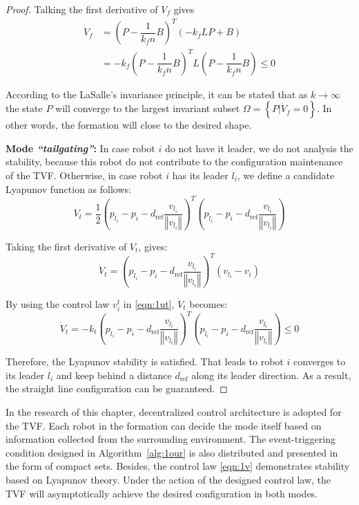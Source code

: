 \begin{proof}
Talking the first derivative of $V_f$ gives
\begin{equation}
\begin{aligned}
    \dot{V}_f&=\left(P-\dfrac{1}{k_fn}B\right)^T\left(-k_fLP+B\right)\\
    &=-k_f\left(P-\dfrac{1}{k_fn}B\right)^TL\left(P-\dfrac{1}{k_fn}B\right)\leq0
\end{aligned}
\end{equation}

According to the LaSalle’s invariance
principle, it can be stated that as $k\to\infty$ the state $P$ will converge to the largest invariant subset $\Omega=\left\{P|\dot{V}_f=0\right\}$. In other words, the formation will close to the desired shape.

\textbf{Mode \textit{``tailgating''}:} In case robot $i$ do not have it leader, we do not analysis the stability, because this robot do not contribute to the configuration maintenance of the TVF. Otherwise, in case robot $i$ has its leader $l_i$, we define a candidate Lyapunov function as follows:
\begin{equation}
    V_{t}=\dfrac{1}{2}\left(p_{l_i}-p_{i}-d_\text{ref}\dfrac{v_{l_i}}{\left\Vert v_{l_i}\right\Vert}\right)^{T}\left(p_{l_i}-p_{i}-d_\text{ref}\dfrac{v_{l_i}}{\left\Vert v_{l_i}\right\Vert}\right)
\end{equation}

Taking the first derivative of $V_t$, gives:
\begin{equation}
    \dot{V}_{t}=\left(p_{l_i}-p_{i}-d_\text{ref}\dfrac{v_{l_i}}{\left\Vert v_{l_i}\right\Vert}\right)^{T}\left(v_{l_i}-v_{i}\right)
\end{equation}

By using the control law $v^t_i$ in \eqref{eqn:1ut}, $\dot{V}_t$ becomes:
\begin{equation}
    \dot{V}_{t}=-k_{t}\left(p_{l_i}-p_{i}-d_\text{ref}\dfrac{v_{l_i}}{\left\Vert v_{l_i}\right\Vert}\right)^{T}\left(p_{l_i}-p_{i}-d_\text{ref}\dfrac{v_{l_i}}{\left\Vert v_{l_i}\right\Vert}\right)\leq0
\end{equation}

Therefore, the Lyapunov stability is satisfied. That leads to robot $i$ converges to its leader $l_i$ and keep behind a distance $d_\text{ref}$ along its leader direction. As a result, the straight line configuration can be guaranteed.
\end{proof}

\begin{remark}
In the research of this chapter, decentralized control architecture is adopted for the TVF. Each robot in the formation can decide the mode itself based on information collected from the surrounding environment. The event-triggering condition designed in Algorithm~\ref{alg:1our} is also distributed and presented in the form of compact sets. Besides, the control law \eqref{eqn:1v} demonstrates stability based on Lyapunov theory. Under the action of the designed control law, the TVF will asymptotically achieve the desired configuration in both modes.
\end{remark}